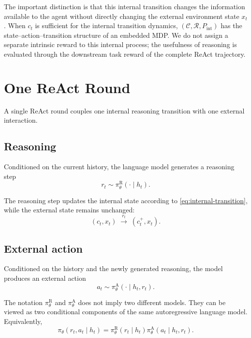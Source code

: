 \documentclass[11pt]{article}
\begin{document}
The important distinction is that this internal transition changes the information available to the agent without directly changing the external environment state \(x_t\). When \(c_t\) is sufficient for the internal transition dynamics, \((\mathcal{C},\mathcal{R},P_{\mathrm{int}})\) has the state--action--transition structure of an embedded MDP. We do not assign a separate intrinsic reward to this internal process; the usefulness of reasoning is evaluated through the downstream task reward of the complete ReAct trajectory.

\section{One ReAct Round}

A single ReAct round couples one internal reasoning transition with one external interaction.

\subsection{Reasoning}

Conditioned on the current history, the language model generates a reasoning step
\begin{equation}
    r_t
    \sim
    \pi^{\mathrm{R}}_{\theta}(\cdot\mid h_t).
    \label{eq:reason}
\end{equation}

The reasoning step updates the internal state according to \eqref{eq:internal-transition}, while the external state remains unchanged:
\[
(c_t,x_t)
\;\xrightarrow{\;r_t\;}\;
(c_t^{+},x_t).
\]

\subsection{External action}

Conditioned on the history and the newly generated reasoning, the model produces an external action
\begin{equation}
    a_t
    \sim
    \pi^{\mathrm{A}}_{\theta}(\cdot\mid h_t,r_t).
    \label{eq:action}
\end{equation}

The notation \(\pi^{\mathrm{R}}_{\theta}\) and \(\pi^{\mathrm{A}}_{\theta}\) does not imply two different models. They can be viewed as two conditional components of the same autoregressive language model. Equivalently,
\begin{equation}
    \pi_{\theta}(r_t,a_t\mid h_t)
    =
    \pi^{\mathrm{R}}_{\theta}(r_t\mid h_t)
    \pi^{\mathrm{A}}_{\theta}(a_t\mid h_t,r_t).
    \label{eq:factorization}
\end{equation}
\end{document}
